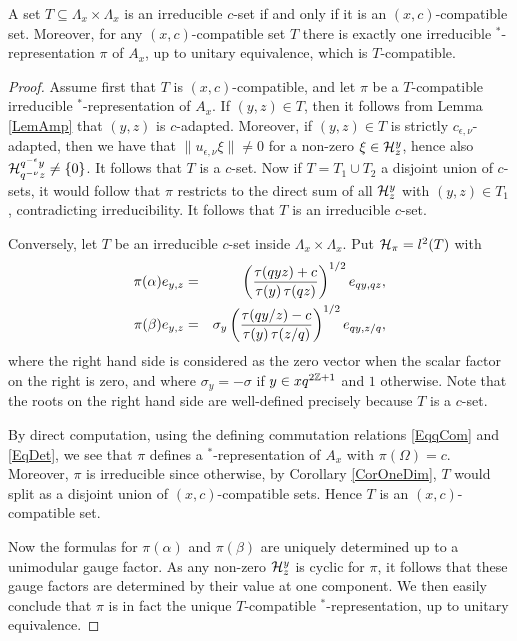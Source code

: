 \begin{Prop}\label{PropClassRep} A set $T\subseteq \Lambda_x\times \Lambda_x$ is an irreducible $c$-set if and only if it is an $(x,c)$-compatible set. Moreover, for any $(x,c)$-compatible set $T$ there is exactly one irreducible $^*$-representation $\pi$ of $A_x$, up to unitary equivalence, which is $T$-compatible.
\end{Prop}

\begin{proof} Assume first that $T$ is $(x,c)$-compatible, and let $\pi$ be a $T$-compatible irreducible $^*$-representation of $A_x$. If $(y,z)\in T$, then it follows from Lemma \ref{LemAmp} that $(y,z)$ is $c$-adapted. Moreover, if $(y,z)\in T$ is strictly $c_{\epsilon,\nu}$-adapted, then we have that $\|u_{\epsilon,\nu}\xi\|\neq 0$ for a non-zero $\xi\in \mathcal{H}^y_z$, hence also $\mathcal{H}^{q^{-\epsilon}y}_{q^{-\nu}z}\neq \{0\}$. It follows that $T$ is a $c$-set. Now if $T=T_1\cup T_2$ a disjoint union of $c$-sets, it would follow that $\pi$ restricts to the direct sum of all $\mathcal{H}^y_z$ with $(y,z)\in T_1$, contradicting irreducibility. It follows that $T$ is an irreducible $c$-set.

Conversely, let $T$ be an irreducible $c$-set inside $\Lambda_x\times \Lambda_x$. Put $\mathcal{H}_{\pi} = l^2(T)$ with \begin{eqnarray*} \pi(\alpha) e_{y,z} &=&  \left(\frac{\operatorname{\tau}(qyz)+c}{\operatorname{\tau}(y)\operatorname{\tau}(qz)}\right)^{1/2}e_{qy,qz},\\ \pi(\beta) e_{y,z} &=& \sigma_y\left(\frac{\operatorname{\tau}(qy/z)-c}{\operatorname{\tau}(y)\operatorname{\tau}(z/q)}\right)^{1/2} e_{qy,z/q},\end{eqnarray*} where the right hand side is considered as the zero vector when the scalar factor on the right is zero, and where $\sigma_y = -\sigma$ if $y\in xq^{2\mathbb{Z}+1}$ and $1$ otherwise. Note that the roots on the right hand side are well-defined precisely because $T$ is a $c$-set. 

By direct computation, using the defining commutation relations \eqref{EqqCom} and \eqref{EqDet}, we see that $\pi$ defines a $^*$-representation of $A_x$ with $\pi(\Omega) =c$. Moreover, $\pi$ is irreducible since otherwise, by Corollary \ref{CorOneDim}, $T$ would split as a disjoint union of $(x,c)$-compatible sets. Hence $T$ is an $(x,c)$-compatible set.

Now the formulas for $\pi(\alpha)$ and $\pi(\beta)$ are uniquely determined up to a unimodular gauge factor. As any non-zero $\mathcal{H}^{y}_z$ is cyclic for $\pi$, it follows that these gauge factors are determined by their value at one component. We then easily conclude that $\pi$ is in fact the unique $T$-compatible $^*$-representation, up to unitary equivalence.
\end{proof}

